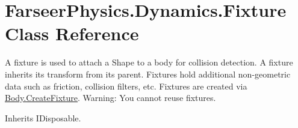 \hypertarget{class_farseer_physics_1_1_dynamics_1_1_fixture}{\section{Farseer\+Physics.\+Dynamics.\+Fixture Class Reference}
\label{class_farseer_physics_1_1_dynamics_1_1_fixture}
}


A fixture is used to attach a Shape to a body for collision detection. A fixture inherits its transform from its parent. Fixtures hold additional non-\/geometric data such as friction, collision filters, etc. Fixtures are created via \hyperlink{class_farseer_physics_1_1_dynamics_1_1_body_af7fe516c55d961070fdde4f3b280e771}{Body.\+Create\+Fixture}. Warning\+: You cannot reuse fixtures.  




Inherits I\+Disposable.

